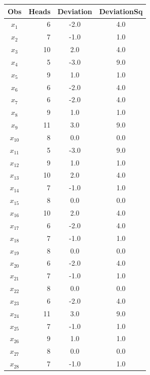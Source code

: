 \documentclass[nohyper,justified]{tufte-handout}\usepackage[]{graphicx}\usepackage[]{color}
\begin{document}
\begin{table}[ht]
\centering
\begin{tabular}{cr|c|c|}
  \toprule
Obs & Heads & Deviation & DeviationSq \\ 
  \midrule
$x_{1}$ & 6 & -2.0 & 4.0 \\ 
   \rowcolor[gray]{0.95}$x_{2}$ & 7 & -1.0 & 1.0 \\ 
  $x_{3}$ & 10 & 2.0 & 4.0 \\ 
   \rowcolor[gray]{0.95}$x_{4}$ & 5 & -3.0 & 9.0 \\ 
  $x_{5}$ & 9 & 1.0 & 1.0 \\ 
   \rowcolor[gray]{0.95}$x_{6}$ & 6 & -2.0 & 4.0 \\ 
  $x_{7}$ & 6 & -2.0 & 4.0 \\ 
   \rowcolor[gray]{0.95}$x_{8}$ & 9 & 1.0 & 1.0 \\ 
  $x_{9}$ & 11 & 3.0 & 9.0 \\ 
   \rowcolor[gray]{0.95}$x_{10}$ & 8 & 0.0 & 0.0 \\ 
  $x_{11}$ & 5 & -3.0 & 9.0 \\ 
   \rowcolor[gray]{0.95}$x_{12}$ & 9 & 1.0 & 1.0 \\ 
  $x_{13}$ & 10 & 2.0 & 4.0 \\ 
   \rowcolor[gray]{0.95}$x_{14}$ & 7 & -1.0 & 1.0 \\ 
  $x_{15}$ & 8 & 0.0 & 0.0 \\ 
   \rowcolor[gray]{0.95}$x_{16}$ & 10 & 2.0 & 4.0 \\ 
  $x_{17}$ & 6 & -2.0 & 4.0 \\ 
   \rowcolor[gray]{0.95}$x_{18}$ & 7 & -1.0 & 1.0 \\ 
  $x_{19}$ & 8 & 0.0 & 0.0 \\ 
   \rowcolor[gray]{0.95}$x_{20}$ & 6 & -2.0 & 4.0 \\ 
  $x_{21}$ & 7 & -1.0 & 1.0 \\ 
   \rowcolor[gray]{0.95}$x_{22}$ & 8 & 0.0 & 0.0 \\ 
  $x_{23}$ & 6 & -2.0 & 4.0 \\ 
   \rowcolor[gray]{0.95}$x_{24}$ & 11 & 3.0 & 9.0 \\ 
  $x_{25}$ & 7 & -1.0 & 1.0 \\ 
   \rowcolor[gray]{0.95}$x_{26}$ & 9 & 1.0 & 1.0 \\ 
  $x_{27}$ & 8 & 0.0 & 0.0 \\ 
   \rowcolor[gray]{0.95}$x_{28}$ & 7 & -1.0 & 1.0 \\ 

\end{tabular}
\end{table}
\end{document}
